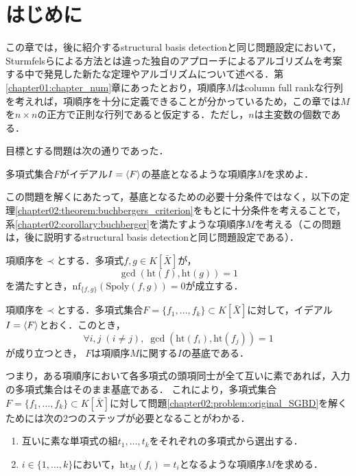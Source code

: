 \section{はじめに}
この章では，後に紹介するstructural \groebner{} basis detectionと同じ問題設定において，Sturmfelsらによる方法とは違った独自のアプローチによるアルゴリズムを考案する中で発見した新たな定理やアルゴリズムについて述べる．第\ref{chapter01:chapter_num}章にあったとおり，項順序$M$はcolumn full rankな行列を考えれば，項順序を十分に定義できることが分かっているため，この章では$M$を$n \times n$の正方で正則な行列であると仮定する．ただし，$n$は主変数の個数である．
\par
目標とする問題は次の通りであった．
\begin{problem}
	\label{chapter02:problem:original_SGBD}
	多項式集合$F$がイデアル$I = \langle F \rangle$の\groebner{}基底となるような項順序$M$を求めよ．
\end{problem}
この問題を解くにあたって，\groebner{}基底となるための必要十分条件ではなく，以下の定理\ref{chapter02:theorem:buchbergers_criterion}をもとに十分条件を考えることで，系\ref{chapter02:corollary:buchberger}を満たすような項順序$M$を考える（この問題は，後に説明するstructural \groebner{} basis detectionと同じ問題設定である）．
\begin{theorem}[Buchbergerの判定条件]
	\label{chapter02:theorem:buchbergers_criterion}
	項順序を$\prec$とする．多項式$f, g \in K[\bar{X}]$が，
	$$\gcd(\mathrm{ht}(f), \mathrm{ht}(g))=1$$を満たすとき，$\mathrm{nf}_{\{f, g\}}(\mathrm{Spoly}(f, g)) = 0$が成立する．
	\end{theorem}
	\begin{corollary}
	\label{chapter02:corollary:buchberger}
	項順序を$\prec$とする．多項式集合$F=\{ f_1, \dots, f_k \} \subset K[\bar{X}]$に対して，イデアル$I = \langle F \rangle$とおく．このとき，
	$$\forall i, j \; (i \ne j), \; \gcd(\mathrm{ht}(f_i), \mathrm{ht}(f_j))=1$$
	が成り立つとき， $F$は項順序$M$に関する$I$の\groebner{}基底である．
\end{corollary}
つまり，ある項順序において各多項式の頭項同士が全て互いに素であれば，入力の多項式集合はそのまま\groebner{}基底である．
これにより，多項式集合$F = \{f_1, \dots, f_k\}\subset K[\bar{X}]$に対して問題\ref{chapter02:problem:original_SGBD}を解くためには次の2つのステップが必要となることがわかる．
\par
\begin{enumerate}
	\item 互いに素な単項式の組$t_1, \dots, t_k$をそれぞれの多項式から選出する．
	\item $i \in \{1, \dots, k\}$において，$\mathrm{ht}_M(f_i) = t_i$となるような項順序$M$を求める．
\end{enumerate}




